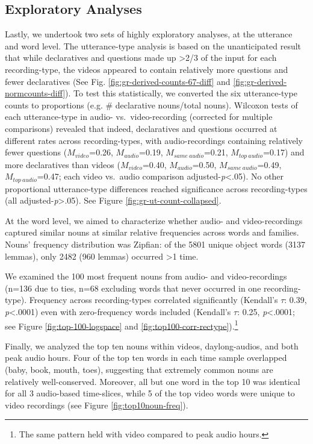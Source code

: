 \documentclass[man]{apa6}
\theoremstyle{definition}
\theoremstyle{definition}
\theoremstyle{definition}
\theoremstyle{remark}
\begin{document}
\subsection{Exploratory Analyses}\label{exploratory-analyses}

Lastly, we undertook two sets of highly exploratory analyses, at the
utterance and word level. The utterance-type analysis is based on the
unanticipated result that while declaratives and questions made up
\textgreater{}2/3 of the input for each recording-type, the videos
appeared to contain relatively more questions and fewer declaratives
(See Fig. \ref{fig:gr-derived-counts-67-diff} and
\ref{fig:gr-derived-normcounts-diff}). To test this statistically, we
converted the six utterance-type counts to proportions (e.g. \#
declarative nouns/total nouns). Wilcoxon tests of each utterance-type in
audio- vs.~video-recording (corrected for multiple comparisons) revealed
that indeed, declaratives and questions occurred at different rates
across recording-types, with audio-recordings containing relatively
fewer questions (\(M_{video}\)=0.26, \(M_{audio}\)=0.19,
\(M_{same\  audio}\)=0.21, \(M_{top\  audio}\)=0.17) and more
declaratives than videos (\(M_{video}\)=0.40, \(M_{audio}\)=0.50,
\(M_{same\  audio}\)=0.49, \(M_{top\ audio}\)=0.47; each video vs.~audio
comparison adjusted-\emph{p}\textless{}.05). No other proportional
utterance-type differences reached significance across recording-types
(all adjusted-\emph{p}\textgreater{}.05). See Figure
\ref{fig:gr-ut-count-collapsed}.

At the word level, we aimed to characterize whether audio- and
video-recordings captured similar nouns at similar relative frequencies
across words and families. Nouns' frequency distribution was Zipfian: of
the 5801 unique object words (3137 lemmas), only 2482 (960 lemmas)
occurred \textgreater{}1 time.

We examined the 100 most frequent nouns from audio- and video-recordings
(n=136 due to ties, n=68 excluding words that never occurred in one
recording-type). Frequency across recording-types correlated
significantly (Kendall's \(\tau\): 0.39, \emph{p}\textless{}.0001) even
with zero-frequency words included (Kendall's \(\tau\): 0.25,
\emph{p}\textless{}.0001; see Figure \ref{fig:top-100-logspace} and
\ref{fig:top100-corr-rectype}).\footnote{The same pattern held with video compared to peak audio hours.}

Finally, we analyzed the top ten nouns within videos, daylong-audios,
and both peak audio hours. Four of the top ten words in each time sample
overlapped (baby, book, mouth, toes), suggesting that extremely common
nouns are relatively well-conserved. Moreover, all but one word in the
top 10 was identical for all 3 audio-based time-slices, while 5 of the
top video words were unique to video recordings (see Figure
\ref{fig:top10noun-freq}).
\end{document}
